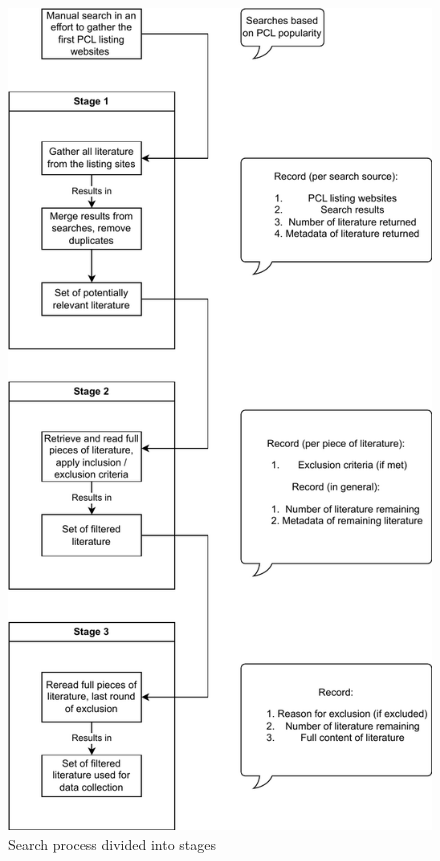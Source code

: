 \begin{figure}
	\centering
	\includegraphics[scale=0.67]{figures/search-process.pdf}
	\caption{Search process divided into stages}
	\label{fig:search-process}
\end{figure}


